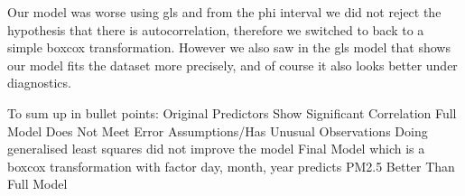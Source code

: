 \documentclass[
]{report}
\begin{document}
Our model was worse using gls and from the phi interval we did not
reject the hypothesis that there is autocorrelation, therefore we
switched to back to a simple boxcox transformation. However we also saw
in the gls model that shows our model fits the dataset more precisely,
and of course it also looks better under diagnostics.

To sum up in bullet points: Original Predictors Show Significant
Correlation Full Model Does Not Meet Error Assumptions/Has Unusual
Observations Doing generalised least squares did not improve the model
Final Model which is a boxcox transformation with factor day, month,
year predicts PM2.5 Better Than Full Model
\end{document}
